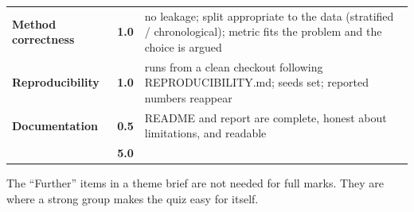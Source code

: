 \documentclass[11pt]{article}
\begin{document}
{\begin{longtable}[]{@{}lll@{}}
\begin{minipage}[t]{0.30\columnwidth}\raggedright
\textbf{Method correctness}\strut
\end{minipage} & \begin{minipage}[t]{0.30\columnwidth}\raggedright
\textbf{1.0}\strut
\end{minipage} & \begin{minipage}[t]{0.30\columnwidth}\raggedright
no leakage; split appropriate to the data (stratified / chronological); metric fits the problem and the choice is argued\strut
\end{minipage}\tabularnewline
\begin{minipage}[t]{0.30\columnwidth}\raggedright
\textbf{Reproducibility}\strut
\end{minipage} & \begin{minipage}[t]{0.30\columnwidth}\raggedright
\textbf{1.0}\strut
\end{minipage} & \begin{minipage}[t]{0.30\columnwidth}\raggedright
runs from a clean checkout following REPRODUCIBILITY.md; seeds set; reported numbers reappear\strut
\end{minipage}\tabularnewline
\begin{minipage}[t]{0.30\columnwidth}\raggedright
\textbf{Documentation}\strut
\end{minipage} & \begin{minipage}[t]{0.30\columnwidth}\raggedright
\textbf{0.5}\strut
\end{minipage} & \begin{minipage}[t]{0.30\columnwidth}\raggedright
README and report are complete, honest about limitations, and readable\strut
\end{minipage}\tabularnewline
\begin{minipage}[t]{0.30\columnwidth}\raggedright
\strut
\end{minipage} & \begin{minipage}[t]{0.30\columnwidth}\raggedright
\textbf{5.0}\strut
\end{minipage} & \begin{minipage}[t]{0.30\columnwidth}\raggedright
\strut
\end{minipage}\tabularnewline
\bottomrule
\end{longtable}
}

The ``Further'' items in a theme brief are not needed for full marks. They are where
a strong group makes the quiz easy for itself.
\end{document}
